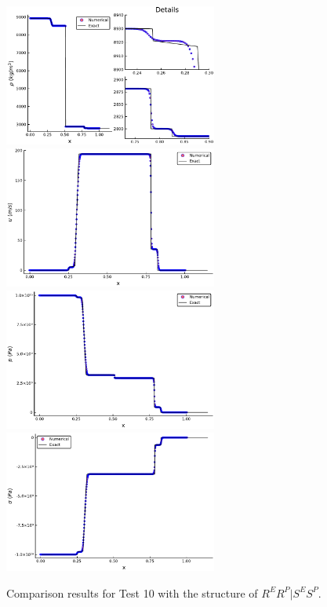\documentclass{article}
\numberwithin{equation}{section}
\numberwithin{table}{section}
\begin{document}
\begin{figure}[ht]
  \centering
  \includegraphics[width= 7cm] {case8rho.pdf}
  \includegraphics[width= 7cm] {case8u.pdf}
  \includegraphics[width= 7cm] {case8p.pdf}
  \includegraphics[width= 7cm] {case8sigma.pdf}

    \caption{Comparison results for Test 10 with the structure of $R^ER^P|S^ES^P$.  }
  \label{fig:case8}
\end{figure}
\end{document}
